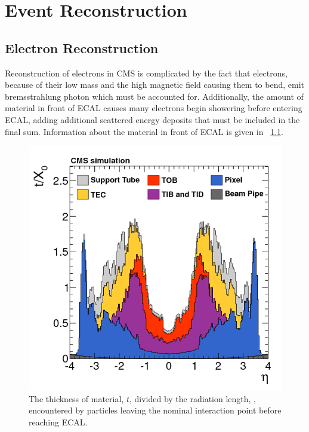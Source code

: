 \chapter{Event Reconstruction}
\label{reconstruction_chapter}

\section{Electron Reconstruction}
\label{sec:electron_reconstruction}

Reconstruction of electrons in CMS is complicated by the fact that electrons,
because of their low mass and the high magnetic field causing them to bend,
emit bremsstrahlung photon which must be accounted for. Additionally, the
amount of material in front of ECAL causes many electrons begin showering
before entering ECAL, adding additional scattered energy deposits that must be
included in the final sum. Information about the material in front of ECAL is
given in \FIG~\ref{fig:tracker_material}\cite{cms_tracker_2014}.

\begin{figure}[tb]
    \centering
    \includegraphics[width=\textwidth]{figures/tracker_material_budget.png}
    \caption{
        The thickness of material, $t$, divided by the radiation length,
        \radiationlength, encountered by particles leaving the nominal
        interaction point before reaching ECAL.
    }
    \label{fig:tracker_material}
\end{figure}


